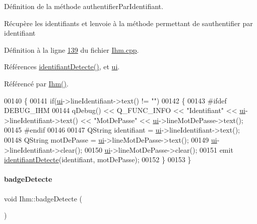 Définition de la méthode authentifier\+Par\+Identifiant. 

Récupère les identifiants et l\textquotesingle{}envoie à la méthode permettant de s\textquotesingle{}authentifier par identifiant 

Définition à la ligne \hyperlink{_ihm_8cpp_source_l00139}{139} du fichier \hyperlink{_ihm_8cpp_source}{Ihm.\+cpp}.



Références \hyperlink{class_ihm_a7cbb2cb835ec643c0a673082d2956405}{identifiant\+Detecte()}, et \hyperlink{_ihm_8h_source_l00099}{ui}.



Référencé par \hyperlink{_ihm_8cpp_source_l00029}{Ihm()}.


\begin{DoxyCode}
00140 \{
00141     \textcolor{keywordflow}{if}(\hyperlink{class_ihm_a0ac5f47856566ceeeca1720109bf70ea}{ui}->lineIdentifiant->text() != \textcolor{stringliteral}{""})
00142     \{
00143 \textcolor{preprocessor}{        #ifdef DEBUG\_IHM}
00144             qDebug() << Q\_FUNC\_INFO << \textcolor{stringliteral}{"Identifiant"} << \hyperlink{class_ihm_a0ac5f47856566ceeeca1720109bf70ea}{ui}->lineIdentifiant->text() << \textcolor{stringliteral}{"MotDePasse"} << 
      \hyperlink{class_ihm_a0ac5f47856566ceeeca1720109bf70ea}{ui}->lineMotDePasse->text();
00145 \textcolor{preprocessor}{        #endif}
00146 
00147         QString identifiant = \hyperlink{class_ihm_a0ac5f47856566ceeeca1720109bf70ea}{ui}->lineIdentifiant->text();
00148         QString motDePasse = \hyperlink{class_ihm_a0ac5f47856566ceeeca1720109bf70ea}{ui}->lineMotDePasse->text();
00149         \hyperlink{class_ihm_a0ac5f47856566ceeeca1720109bf70ea}{ui}->lineIdentifiant->clear();
00150         \hyperlink{class_ihm_a0ac5f47856566ceeeca1720109bf70ea}{ui}->lineMotDePasse->clear();
00151         emit \hyperlink{class_ihm_a7cbb2cb835ec643c0a673082d2956405}{identifiantDetecte}(identifiant, motDePasse);
00152     \}
00153 \}
\end{DoxyCode}
\mbox{\label{class_ihm_a15daf0d4cd7c9afd6c97788e54328133}} 
\paragraph{\texorpdfstring{badge\+Detecte}{badgeDetecte}}
{\footnotesize\ttfamily void Ihm\+::badge\+Detecte (\begin{DoxyParamCaption}\item[{Q\+String}]{ }\end{DoxyParamCaption})\hspace{0.3cm}{\ttfamily [signal]}}



